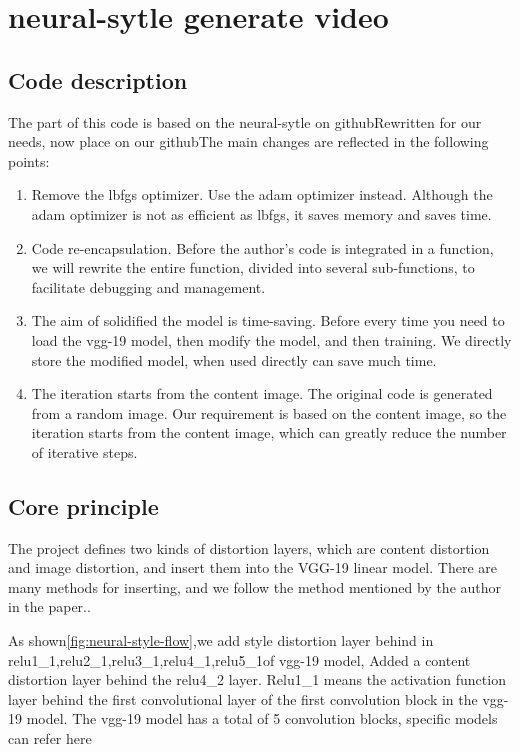 \section{neural-sytle generate video}
\subsection{Code description}
The part of this code is based on the neural-sytle on github\cite{neural-style}Rewritten for our needs, now place on our github\cite{neural-style-diy}The main changes are reflected in the following points:
\begin{enumerate}
  \item Remove the lbfgs optimizer. Use the adam optimizer instead. Although the adam optimizer is not as efficient as lbfgs, it saves memory and saves time.
  \item Code re-encapsulation. Before the author's code is integrated in a function, we will rewrite the entire function, divided into several sub-functions, to facilitate debugging and management.
  \item The aim of solidified the model is time-saving. Before every time you need to load the vgg-19 model, then modify the model, and then training. We directly store the modified model, when used directly can save much time.
  \item The iteration starts from the content image. The original code is generated from a random image. Our requirement is based on the content image, so the iteration starts from the content image, which can greatly reduce the number of iterative steps.
\end{enumerate}
\subsection{Core principle}
The project defines two kinds of distortion layers, which are content distortion and image distortion, and insert them into the VGG-19 linear model. There are many methods for inserting, and we follow the method mentioned by the author in the paper.\cite{article:neural-style}.

As shown\ref{fig:neural-style-flow},we add style distortion layer behind in relu1\_1,relu2\_1,relu3\_1,relu4\_1,relu5\_1of vgg-19 model, Added a content distortion layer behind the relu4\_2 layer. Relu1\_1 means the activation function layer behind the first convolutional layer of the first convolution block in the vgg-19 model. The vgg-19 model has a total of 5 convolution blocks, specific models can refer here\cite{vgg-19}

